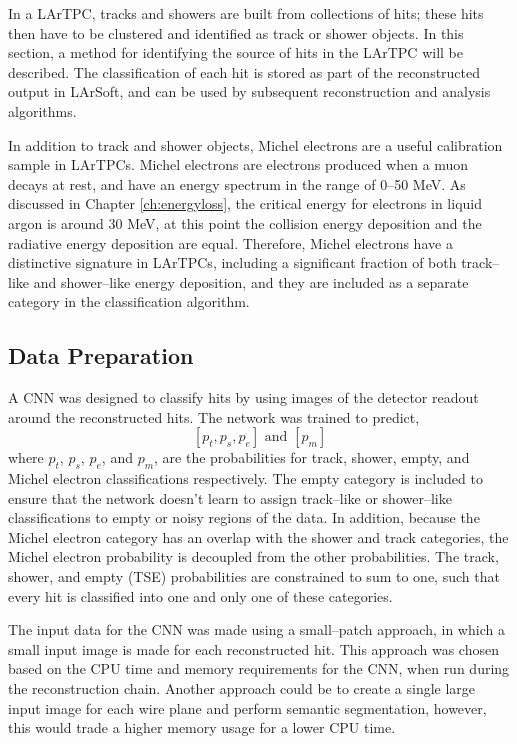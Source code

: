 In a LArTPC, tracks and showers are built from collections of hits; these hits
then have to be clustered and identified as track or shower objects. In this 
section, a method for identifying the source of hits in the \protodune{} 
LArTPC will be described. The classification of each hit is stored as part of 
the reconstructed output in LArSoft, and can be used by subsequent 
reconstruction and analysis algorithms.

In addition to track and shower objects, Michel electrons are a useful 
calibration sample in LArTPCs. Michel electrons are electrons produced when a 
muon decays at rest, and have an energy spectrum in the range of 0--50 MeV. 
As discussed in Chapter \ref{ch:energyloss}, the critical energy for electrons 
in liquid argon is around 30 MeV, at this point the collision energy deposition 
and the radiative energy deposition are equal. Therefore, Michel electrons 
have a distinctive signature in LArTPCs, including a significant fraction of
both track--like and shower--like energy deposition, and they are included as 
a separate category in the classification algorithm.

\subsection{Data Preparation}

A CNN was designed to classify hits by using images of the detector readout
around the reconstructed hits. The network was trained to predict,
\begin{equation*}
	\left[ p_t, p_s, p_e \right] \mbox{ and } \left[ p_m \right]
\end{equation*}
where $p_t$, $p_s$, $p_e$, and $p_m$, are the probabilities for track, shower,
empty, and Michel electron classifications respectively. The empty category is
included to ensure that the network doesn't learn to assign track--like or
shower--like classifications to empty or noisy regions of the data. In addition,
because the Michel electron category has an overlap with the shower and track
categories, the Michel electron probability is decoupled from the other 
probabilities. The track, shower, and empty (TSE) probabilities are 
constrained to sum to one, such that every hit is classified into one and only
one of these categories.

The input data for the CNN was made using a small--patch approach, in
which a small input image is made for each reconstructed hit. This approach was
chosen based on the CPU time and memory requirements for the CNN, when run 
during the \protodune{} reconstruction chain. Another approach could be to 
create a single large input image for each wire plane and perform semantic 
segmentation, however, this would trade a higher memory usage for a lower CPU 
time.

